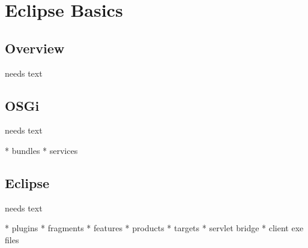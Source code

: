 \documentclass[a4paper,10pt,twoside]{book}
\begin{document}
  \sloppy
\fi


\chapter{Eclipse Basics}

\section{Overview}
needs text

\section{OSGi}
needs text

  * bundles
  * services
  
\section{Eclipse}
needs text

  * plugins
  * fragments
  * features
  * products
  * targets
  * servlet bridge
  * client exe files
  
  
\ifx\wholebook\relax\else
   
   
\end{document}
